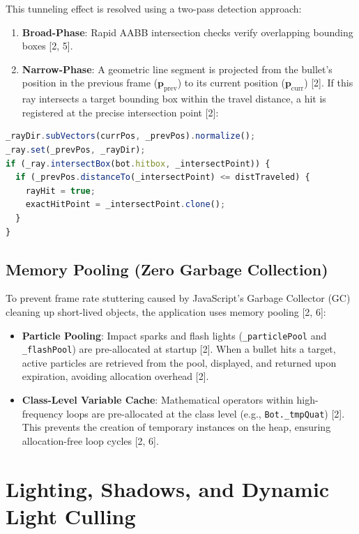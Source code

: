 \documentclass[11pt,a4paper,oneside]{article}
\begin{document}
This tunneling effect is resolved using a two-pass detection approach:
\begin{enumerate}
    \item \textbf{Broad-Phase}: Rapid AABB intersection checks verify overlapping bounding boxes [2, 5].
    \item \textbf{Narrow-Phase}: A geometric line segment is projected from the bullet's position in the previous frame ($\mathbf{p}_{\text{prev}}$) to its current position ($\mathbf{p}_{\text{curr}}$) [2]. If this ray intersects a target bounding box within the travel distance, a hit is registered at the precise intersection point [2]:
\end{enumerate}
\begin{lstlisting}[language=JavaScript, caption={Raycast intersection calculations}]
_rayDir.subVectors(currPos, _prevPos).normalize();
_ray.set(_prevPos, _rayDir);
if (_ray.intersectBox(bot.hitbox, _intersectPoint)) {
  if (_prevPos.distanceTo(_intersectPoint) <= distTraveled) {
    rayHit = true;
    exactHitPoint = _intersectPoint.clone();
  }
}
\end{lstlisting}

\subsection{Memory Pooling (Zero Garbage Collection)}
To prevent frame rate stuttering caused by JavaScript's Garbage Collector (GC) cleaning up short-lived objects, the application uses memory pooling [2, 6]:
\begin{itemize}
    \item \textbf{Particle Pooling}: Impact sparks and flash lights (\texttt{\_particlePool} and \texttt{\_flashPool}) are pre-allocated at startup [2]. When a bullet hits a target, active particles are retrieved from the pool, displayed, and returned upon expiration, avoiding allocation overhead [2].
    \item \textbf{Class-Level Variable Cache}: Mathematical operators within high-frequency loops are pre-allocated at the class level (e.g., \texttt{Bot.\_tmpQuat}) [2]. This prevents the creation of temporary instances on the heap, ensuring allocation-free loop cycles [2, 6].
\end{itemize}

\newpage
\section{Lighting, Shadows, and Dynamic Light Culling}
\end{document}
